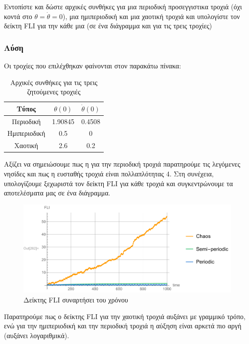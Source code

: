 \documentclass{article}
\begin{document}
\indent Εντοπίστε και δώστε αρχικές συνθήκες για μια περιοδική προσεγγιστικα τροχιά (όχι κοντά στο \(\theta = \dot{\theta} =0\)), μια ημιπεριοδική και μια χαοτική τροχιά και υπολογίστε τον δείκτη \textlatin{FLI} για την κάθε μια (σε ένα διάγραμμα και για τις τρεις τροχίες)

\subsubsection{Λύση}

\indent Οι τροχίες που επιλέχθηκαν φαίνονται στον παρακάτω πίνακα:

\begin{table}[H]
\centering
\caption{Αρχικές συνθήκες για τις τρεις ζητούμενες τροχιές}
\begin{tabular}{|c|c|c|}
\hline
\textbf{Τύπος}        & \(\theta(0)\)      & \(\dot{\theta}(0)\)  \\ \hline
Περιοδική    & 1.90845 & 0.4508 \\ \hline
Ημιπεριοδική & 0.5     & 0      \\ \hline
Χαοτική      & 2.6     & 0.2    \\ \hline
\end{tabular}
\end{table}

Αξίζει να σημειώσουμε πως η για την περιοδική τροχιά παρατηρούμε τις λεγόμενες νησίδες και πως η ευσταθής τροχιά είναι πολλαπλότητας 4. Στη συνέχεια, υπολογίζουμε ξεχωριστά τον δείκτη \textlatin{FLI} για κάθε τροχιά και συγκεντρώνουμε τα αποτελέσματα μας σε ένα διάγραμμα.

\begin{figure}[H]
    \centering
    \includegraphics{AD_Pend_4/FLI_time.pdf}
    \caption{Δείκτης \textlatin{FLI} συναρτήσει του χρόνου}
    \label{fig:fli_index}
\end{figure}

Παρατηρούμε πως ο δείκτης \textlatin{FLI} για την χαοτική τροχιά αυξάνει με γραμμικό τρόπο, ενώ για την ημιπεριοδική και την περιοδική τροχιά η αύξηση είναι αρκετά πιο αργή (αυξάνει λογαριθμικά).
\end{document}
